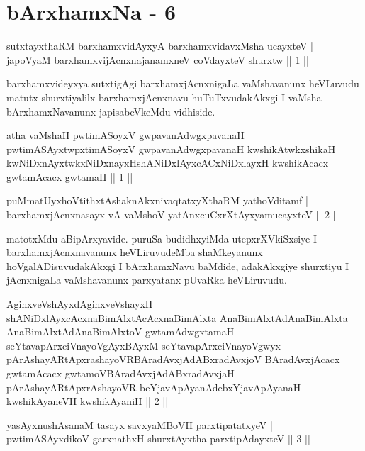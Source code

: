 \chapter{bArxhamxNa - 6}

\begin{shl}
sutxtayxthaRM barxhamxvidAyxyA barxhamxvidavxMsha ucayxteV |\\
japoV\s yaM barxhamxvijAcnxnajanamxneV coVdayxteV shurxtw \hfill || 1 ||
\end{shl}

\begin{artha}
barxhamxvideyxya sutxtigAgi barxhamxjAcnxnigaLa vaMshavanunx heVLuvudu matutx shurxtiyalilx barxhamxjAcnxnavu huTuTxvudakAkxgi I vaMsha bArxhamxNavanunx japisabeVkeMdu vidhiside.
\end{artha}
\vskip 2pt
\vskip 2pt
\begin{kandikeshl}
atha vaMshaH pwtimASoyxV gwpavanAdwgxpavanaH pwtimASAyxtwpxti\-\break mASoyxV gwpavanAdwgxpavanaH kwshikAtwkxshikaH kwNiDxnAyxtwkxNiDxnayxH\break shANiDxlAyxcACxNiDxlayxH kwshikAcacx gwtamAcacx gwtamaH || 1 ||
\end{kandikeshl}
\vskip 2pt
\begin{shl}
puMmatUyxhoVtithxtAshaknAkxnivaqtatxyXthaRM yathoVditamf |\\
barxhamxjAcnxnasayx vA vaMshoV yatAnxcuCxrXtAyx\s yamucayxteV \hfill || 2 ||
\end{shl}
\vskip 2pt
\begin{artha}
matotxMdu aBipArxyavide. puruSa budidhxyiMda utepxrXVkiSxsiye I barxhamxjAcnxnavanunx heVLiruvudeMba shaMkeyanunx hoVgalADisuvudakAkxgi I bArxhamxNavu baMdide, adakAkxgiye shurxtiyu I jAcnxnigaLa vaMshavanunx parxyatanx pUvaRka heVLiruvudu.
\end{artha}
\vskip 2pt
\vskip 2pt
\begin{kandikeshl}
AginxveVshAyxdAginxveVshayxH shANiDxlAyxcAcxnaBimAlxtAcAcxnaBimAlxta AnaBimAlxtAdAnaBimAlxta AnaBimAlxtAdAnaBimAlxtoV gwtamAdwgxtamaH seYtavapArxciVnayoVgAyxBAyxM seYtavapArxciVnayoVgwyx pArAshayARtApxrashayoVR\break BAradAvxjAdABxradAvxjoV BAradAvxjAcacx gwtamAcacx gwtamoV\break BAradAvxjAdABxradAvxjaH pArAshayARtApxrAshayoVR beYjavApAya\-\break nAdebxYjavApAyanaH kwshikAyaneVH kwshikAyaniH || 2 ||
\end{kandikeshl}
\vskip 2pt
\vskip 2pt
\begin{shl}
yasAyxnushAsanaM tasayx savxyaMBoVH parxtipatatxyeV |\\
pwtimASAyxdikoV garxnathxH shurxtAyx\s tha parxtipAdayxteV \hfill || 3 ||
\end{shl}
